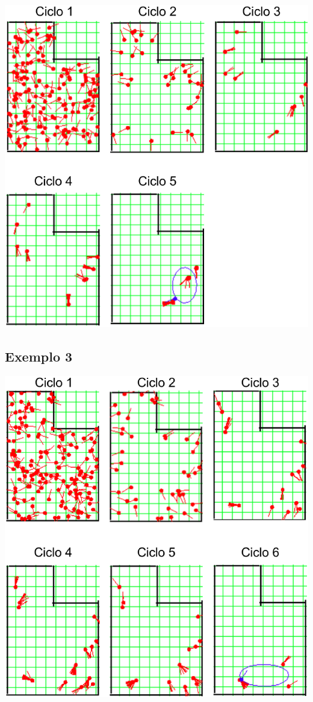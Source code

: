 {\centering
\includegraphics[scale=0.4]{figuras/cen4_ex2.eps}
\label{img:cen4_ex2}
\par}

\subsection{Exemplo 3}

{\centering
\includegraphics[scale=0.4]{figuras/cen4_ex3.eps}
\label{img:cen4_ex3}
\par}

